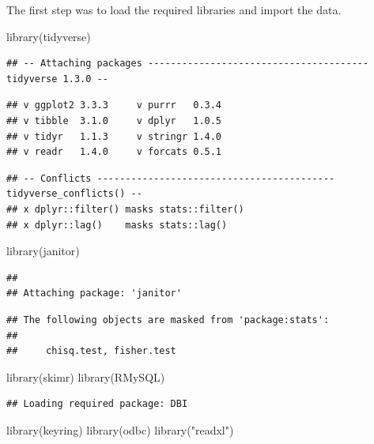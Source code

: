 \documentclass[
]{article}
\newenvironment{Shaded}{\begin{snugshade}}{\end{snugshade}}
\newcommand{\FunctionTok}[1]{\textcolor[rgb]{0.00,0.00,0.00}{#1}}
\newcommand{\NormalTok}[1]{#1}
\newcommand{\StringTok}[1]{\textcolor[rgb]{0.31,0.60,0.02}{#1}}
\begin{document}
The first step was to load the required libraries and import the data.

\begin{Shaded}
\begin{Highlighting}[]
\FunctionTok{library}\NormalTok{(tidyverse)}
\end{Highlighting}
\end{Shaded}

\begin{verbatim}
## -- Attaching packages --------------------------------------- tidyverse 1.3.0 --
\end{verbatim}

\begin{verbatim}
## v ggplot2 3.3.3     v purrr   0.3.4
## v tibble  3.1.0     v dplyr   1.0.5
## v tidyr   1.1.3     v stringr 1.4.0
## v readr   1.4.0     v forcats 0.5.1
\end{verbatim}

\begin{verbatim}
## -- Conflicts ------------------------------------------ tidyverse_conflicts() --
## x dplyr::filter() masks stats::filter()
## x dplyr::lag()    masks stats::lag()
\end{verbatim}

\begin{Shaded}
\begin{Highlighting}[]
\FunctionTok{library}\NormalTok{(janitor)}
\end{Highlighting}
\end{Shaded}

\begin{verbatim}
## 
## Attaching package: 'janitor'
\end{verbatim}

\begin{verbatim}
## The following objects are masked from 'package:stats':
## 
##     chisq.test, fisher.test
\end{verbatim}

\begin{Shaded}
\begin{Highlighting}[]
\FunctionTok{library}\NormalTok{(skimr)}
\FunctionTok{library}\NormalTok{(RMySQL)}
\end{Highlighting}
\end{Shaded}

\begin{verbatim}
## Loading required package: DBI
\end{verbatim}

\begin{Shaded}
\begin{Highlighting}[]
\FunctionTok{library}\NormalTok{(keyring)}
\FunctionTok{library}\NormalTok{(odbc)}
\FunctionTok{library}\NormalTok{(}\StringTok{"readxl"}\NormalTok{)}
\end{Highlighting}
\end{Shaded}
\end{document}
